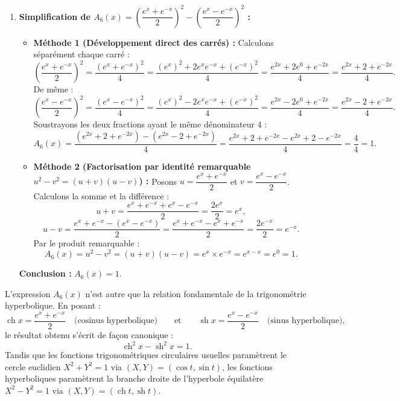 \documentclass[11pt,a4paper]{article}
\newcommand{\sh}{\operatorname{sh}}
\newcommand{\ch}{\operatorname{ch}}
\begin{document}
\begin{correctionbox}[Exercice 1]
\begin{enumerate}[label=\textbf{\arabic*.}]
    \item \textbf{Simplification de $A_6(x) = \left(\dfrac{e^x + e^{-x}}{2}\right)^2 - \left(\dfrac{e^x - e^{-x}}{2}\right)^2$ :}
    \begin{itemize}
        \item \textbf{Méthode 1 (Développement direct des carrés) :}
        Calculons séparément chaque carré :
        \[
        \left(\frac{e^x + e^{-x}}{2}\right)^2 = \frac{(e^x + e^{-x})^2}{4} = \frac{(e^x)^2 + 2 e^x e^{-x} + (e^{-x})^2}{4} = \frac{e^{2x} + 2e^0 + e^{-2x}}{4} = \frac{e^{2x} + 2 + e^{-2x}}{4}.
        \]
        De même :
        \[
        \left(\frac{e^x - e^{-x}}{2}\right)^2 = \frac{(e^x - e^{-x})^2}{4} = \frac{(e^x)^2 - 2 e^x e^{-x} + (e^{-x})^2}{4} = \frac{e^{2x} - 2e^0 + e^{-2x}}{4} = \frac{e^{2x} - 2 + e^{-2x}}{4}.
        \]
        Soustrayons les deux fractions ayant le même dénominateur 4 :
        \[
        A_6(x) = \frac{(e^{2x} + 2 + e^{-2x}) - (e^{2x} - 2 + e^{-2x})}{4} = \frac{e^{2x} + 2 + e^{-2x} - e^{2x} + 2 - e^{-2x}}{4} = \frac{4}{4} = 1.
        \]
        \item \textbf{Méthode 2 (Factorisation par identité remarquable $u^2 - v^2 = (u+v)(u-v)$) :}
        Posons $u = \dfrac{e^x + e^{-x}}{2}$ et $v = \dfrac{e^x - e^{-x}}{2}$.
        Calculons la somme et la différence :
        \[
        u + v = \frac{e^x + e^{-x} + e^x - e^{-x}}{2} = \frac{2e^x}{2} = e^x,
        \]
        \[
        u - v = \frac{e^x + e^{-x} - (e^x - e^{-x})}{2} = \frac{e^x + e^{-x} - e^x + e^{-x}}{2} = \frac{2e^{-x}}{2} = e^{-x}.
        \]
        Par le produit remarquable :
        \[
        A_6(x) = u^2 - v^2 = (u+v)(u-v) = e^x \times e^{-x} = e^{x - x} = e^0 = 1.
        \]
    \end{itemize}
    \textbf{Conclusion :} $\boxed{A_6(x) = 1}$.
\end{enumerate}
\end{correctionbox}

\begin{remarquebox}
L'expression $A_6(x)$ n'est autre que la relation fondamentale de la trigonométrie hyperbolique. En posant :
\[
\ch x = \frac{e^x + e^{-x}}{2} \quad \text{(cosinus hyperbolique)} \qquad \text{et} \qquad \sh x = \frac{e^x - e^{-x}}{2} \quad \text{(sinus hyperbolique)},
\]
le résultat obtenu s'écrit de façon canonique :
\[
\ch^2 x - \sh^2 x = 1.
\]
Tandis que les fonctions trigonométriques circulaires usuelles paramètrent le cercle euclidien $X^2 + Y^2 = 1$ via $(X, Y) = (\cos t, \sin t)$, les fonctions hyperboliques paramètrent la branche droite de l'hyperbole équilatère $X^2 - Y^2 = 1$ via $(X, Y) = (\ch t, \sh t)$.
\end{remarquebox}
\end{document}
